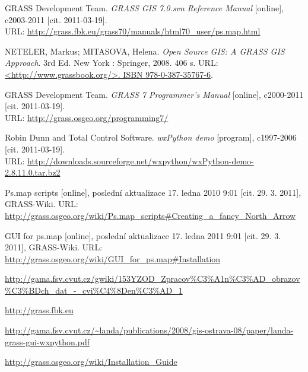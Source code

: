 \documentclass[a4paper,12pt,draft]{article}
\begin{document}
\begin{thebibliography}{9}
\label{literatura}
GRASS Development Team. \textit{GRASS GIS 7.0.svn Reference
Manual} [online], c2003-2011 [cit. 2011-03-19].\\ URL:
\url{http://grass.fbk.eu/grass70/manuals/html70_user/ps.map.html}

NETELER, Markus; MITASOVA, Helena. \textit{Open Source GIS: A
GRASS GIS Approach}. 3rd Ed. New York : Springer, 2008. 406 s. URL:
\url{<http://www.grassbook.org/>. ISBN 978-0-387-35767-6}.

GRASS Development Team. \textit{GRASS 7 Programmer's Manual} [online],
c2000-2011 [cit. 2011-03-19].\\ URL: \url{http://grass.osgeo.org/programming7/}

Robin Dunn and Total Control Software. \textit{wxPython
demo} [program], c1997-2006 [cit. 2011-03-19].\\ URL:
\url{http://downloads.sourceforge.net/wxpython/wxPython-demo-2.8.11.0.tar.bz2}

Ps.map scripts [online], poslední aktualizace
17. ledna 2010 9:01 [cit. 29. 3. 2011], GRASS-Wiki. URL:
\url{http://grass.osgeo.org/wiki/Ps.map_scripts#Creating_a_fancy_North_Arrow}

GUI for ps.map [online], poslední aktualizace
17. ledna 2011 9:01 [cit. 29. 3. 2011], GRASS-Wiki. URL:
\url{http://grass.osgeo.org/wiki/GUI_for_ps.map#Installation}

 \url{http://gama.fsv.cvut.cz/gwiki/153YZOD_Zpracov%C3%A1n%C3%AD_obrazov%C3%BDch_dat_-_cvi%C4%8Den%C3%AD_1}

\url{http://grass.fbk.eu}

\url{http://gama.fsv.cvut.cz/~landa/publications/2008/gis-ostrava-08/paper/landa-grass-gui-wxpython.pdf}
%

\url{http://grass.osgeo.org/wiki/Installation_Guide}

\end{thebibliography}
\end{document}
